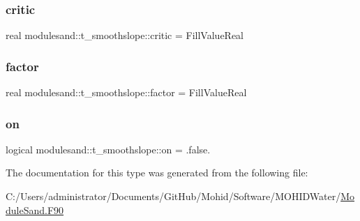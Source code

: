 \subsubsection{\texorpdfstring{critic}{critic}}
{\footnotesize\ttfamily real modulesand\+::t\+\_\+smoothslope\+::critic = Fill\+Value\+Real\hspace{0.3cm}{\ttfamily [private]}}

\mbox{\label{structmodulesand_1_1t__smoothslope_a32b46732076c630a118562465814a23f}} 
\subsubsection{\texorpdfstring{factor}{factor}}
{\footnotesize\ttfamily real modulesand\+::t\+\_\+smoothslope\+::factor = Fill\+Value\+Real\hspace{0.3cm}{\ttfamily [private]}}

\mbox{\label{structmodulesand_1_1t__smoothslope_a47e2c31da895ca2b39f01531a44e24f2}} 
\subsubsection{\texorpdfstring{on}{on}}
{\footnotesize\ttfamily logical modulesand\+::t\+\_\+smoothslope\+::on = .false.\hspace{0.3cm}{\ttfamily [private]}}



The documentation for this type was generated from the following file\+:\begin{DoxyCompactItemize}
\item 
C\+:/\+Users/administrator/\+Documents/\+Git\+Hub/\+Mohid/\+Software/\+M\+O\+H\+I\+D\+Water/\mbox{\hyperlink{_module_sand_8_f90}{Module\+Sand.\+F90}}\end{DoxyCompactItemize}
